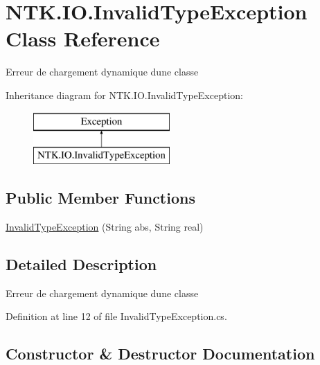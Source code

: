 \hypertarget{class_n_t_k_1_1_i_o_1_1_invalid_type_exception}{}\section{N\+T\+K.\+I\+O.\+Invalid\+Type\+Exception Class Reference}
\label{class_n_t_k_1_1_i_o_1_1_invalid_type_exception}


Erreur de chargement dynamique d\textquotesingle{}une classe  


Inheritance diagram for N\+T\+K.\+I\+O.\+Invalid\+Type\+Exception\+:\begin{figure}[H]
\begin{center}
\leavevmode
\includegraphics[height=2.000000cm]{d6/df9/class_n_t_k_1_1_i_o_1_1_invalid_type_exception}
\end{center}
\end{figure}
\subsection*{Public Member Functions}
\begin{DoxyCompactItemize}
\item 
\mbox{\hyperlink{class_n_t_k_1_1_i_o_1_1_invalid_type_exception_af79cb27f6b0d4f77d66e3f5fa91ed57a}{Invalid\+Type\+Exception}} (String abs, String real)
\end{DoxyCompactItemize}


\subsection{Detailed Description}
Erreur de chargement dynamique d\textquotesingle{}une classe 



Definition at line 12 of file Invalid\+Type\+Exception.\+cs.



\subsection{Constructor \& Destructor Documentation}
\mbox{\label{class_n_t_k_1_1_i_o_1_1_invalid_type_exception_af79cb27f6b0d4f77d66e3f5fa91ed57a}} 
